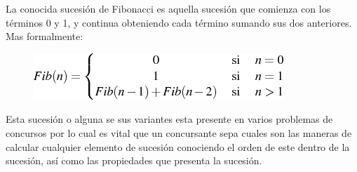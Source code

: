 La conocida sucesión de Fibonacci es aquella sucesión que comienza con los términos 0 y 1, y continua obteniendo cada término sumando sus dos anteriores. Mas formalmente: 

\begin{figure}[h]
	\centering
	\includegraphics[width=0.5\linewidth]{img/generalizacion-fibonacci-1}
	\label{fig:generalizacion-fibonacci-1}
\end{figure}

Esta sucesión o alguna se sus variantes esta presente en varios problemas de concursos por lo cual es vital que un concursante sepa cuales son las maneras de calcular cualquier elemento de sucesión conociendo el orden de este dentro de la sucesión, así como las propiedades que presenta la sucesión.